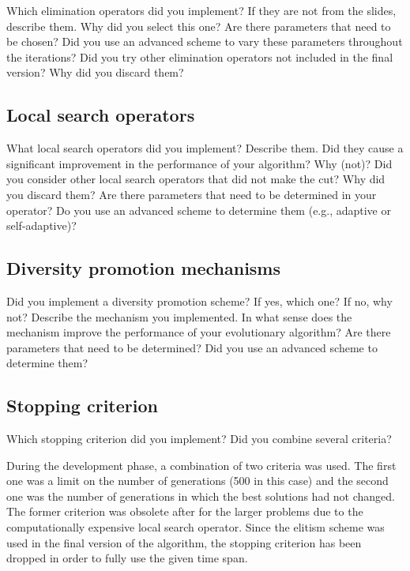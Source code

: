 \documentclass[a4paper,10pt]{article}
\newcommand{\ReplaceMe}[1]{{\color{blue}#1}}
\begin{document}
\ReplaceMe{Which elimination operators did you implement? If they are not from the slides, describe them. Why did you select this one? Are there parameters that need to be chosen? Did you use an advanced scheme to vary these parameters throughout the iterations? Did you try other elimination operators not included in the final version? Why did you discard them?} 

\subsection{Local search operators}

\ReplaceMe{What local search operators did you implement? Describe them. Did they cause a significant improvement in the performance of your algorithm? Why (not)? Did you consider other local search operators that did not make the cut? Why did you discard them? Are there parameters that need to be determined in your operator? Do you use an advanced scheme to determine them (e.g., adaptive or self-adaptive)?}

\subsection{Diversity promotion mechanisms} \label{sec:diversity}

\ReplaceMe{Did you implement a diversity promotion scheme? If yes, which one? If no, why not? Describe the mechanism you implemented. In what sense does the mechanism improve the performance of your evolutionary algorithm? Are there parameters that need to be determined? Did you use an advanced scheme to determine them?}

\subsection{Stopping criterion}

\ReplaceMe{Which stopping criterion did you implement? Did you combine several criteria?}

During the development phase, a combination of two criteria was used. The first one was a limit on the number of generations (500 in this case) and the second one was the number of generations in which the best solutions had not changed. The former criterion was obsolete after for the larger problems due to the computationally expensive local search operator. Since the elitism scheme was used in the final version of the algorithm, the stopping criterion has been dropped in order to fully use the given time span.
\end{document}
